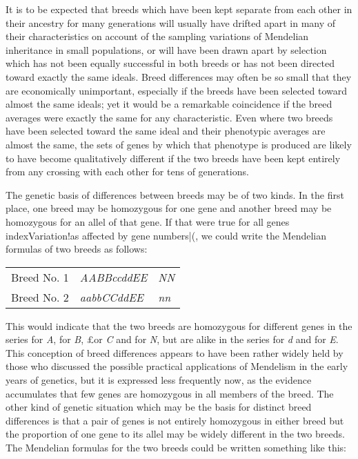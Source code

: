 It is to be expected that breeds which have been kept separate from
each other in their ancestry for many generations will usually have
drifted apart in many of their characteristics on account of the sampling
variations of Mendelian inheritance in small populations, or will have
been drawn apart by selection which has not been equally successful in
both breeds or has not been directed toward exactly the same ideals.
Breed differences may often be so small that they are economically
unimportant, especially if the breeds have been selected toward almost
the same ideals; yet it would be a remarkable coincidence if the breed
averages were exactly the same for any characteristic. Even where two
breeds have been selected toward the same ideal and their phenotypic
averages are almost the same, the sets of genes by which that phenotype
is produced are likely to have become qualitatively different if the two
breeds have been kept entirely from any crossing with each other for
tens of generations.

The genetic basis of differences between breeds may be of two kinds.
In the first place, one breed may be homozygous for one gene and
another breed may be homozygous for an allel of that gene. If that were
true for all genes\\index{Variation!as affected by gene numbers|(}, we could write the Mendelian formulas of two breeds
as follows:

\begin{table}[htbp]
	\centering
	\begin{tabular}{L{2.5cm}L{2.5cm}L{2.5cm}}
		Breed No. 1		& \textit{AABBccddEE}	&	\textit{NN}	\\
		Breed No. 2		& \textit{aabbCCddEE}	&	\textit{nn}	\\
	\end{tabular}
\end{table}

\noindent
This would indicate that the two breeds are homozygous for different
genes in the series for \textit{A}, for \textit{B}, £or \textit{C} and
for \textit{N}, but are alike in the series for \textit{d} and for
\textit{E}. This conception of breed differences appears to have
been rather widely held by those who discussed the possible practical
applications of Mendelism in the early years of genetics, but it is
expressed less frequently now, as the evidence accumulates that few
genes are homozygous in all members of the breed. The other kind of
genetic situation which may be the basis for distinct breed differences is
that a pair of genes is not entirely homozygous in either breed but the
proportion of one gene to its allel may be widely different in the two
breeds. The Mendelian formulas for the two breeds could be written
something like this:

